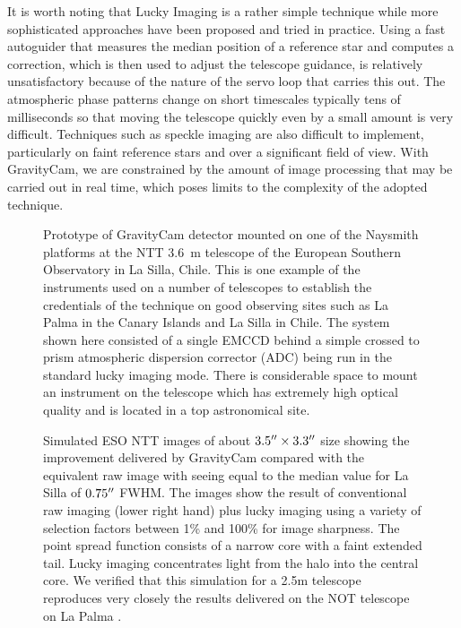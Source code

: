 \documentclass{pasa}%
\newcommand\arcsec{\hbox{$^{\prime\prime}$}}
\begin{document}
It is worth noting that Lucky Imaging is a rather simple technique while more sophisticated approaches have been proposed and tried in practice. Using a fast autoguider that measures the median position of a reference star and computes a correction, which is then used to adjust the telescope guidance, is relatively unsatisfactory because of the nature of the servo loop that carries this out. The atmospheric phase patterns change on short timescales typically tens of milliseconds so that moving the telescope quickly even by a small amount is very difficult. Techniques such as speckle imaging \citep[e.g.][]{Carrano,Loktev} are also difficult to implement, particularly on faint reference stars and over a significant field of view.
With GravityCam, we are constrained by the amount of image processing that may be carried out in real time, which poses limits to the complexity of the adopted technique.

\begin{figure}
\centering
{}
 \caption{Prototype of \mbox{GravityCam} detector mounted on one of the Naysmith platforms at the NTT 3.6~m telescope of the European Southern Observatory in La Silla, Chile. 
 This is one example of the instruments used on a number of telescopes to
establish the credentials of the technique on good observing sites such
as La Palma in the Canary Islands and La Silla in Chile. The system
shown here
consisted of a single EMCCD behind a simple crossed to prism atmospheric dispersion corrector (ADC) being run in the standard lucky imaging mode.  There is considerable space to mount an instrument on the telescope which has extremely high optical quality and is located in a top astronomical site.}
\label{fig:proto}
\end{figure}


 
\begin{figure*}
\centering
{}
\caption{Simulated ESO NTT images of about $3.5\arcsec \times 3.3\arcsec$ size showing the improvement delivered by \mbox{GravityCam} compared with the equivalent raw image with seeing equal to the median value for La Silla of $0.75\arcsec$ FWHM. The images show the result of conventional raw imaging (lower right hand) plus lucky imaging using a variety of selection factors between 1\% and 100\% for image sharpness. The point spread function consists of a narrow core with a faint extended tail. Lucky imaging concentrates light from the halo into the central core. We verified that this simulation for a 2.5m telescope reproduces very closely the results delivered on the NOT telescope on La Palma \protect\citep{Baldwin+2008}.}
\label{fig:imagesimu}
\end{figure*}
\end{document}
